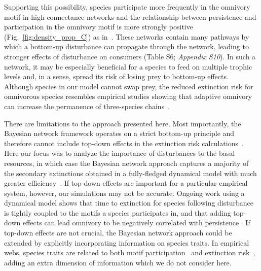 \documentclass[12pt]{article}
\begin{document}
\begin{spacing}{2.0}
    Supporting this possibility, species participate more frequently in the omnivory motif in high-connectance networks and the relationship between persistence and participation in the omnivory motif is more strongly positive (Fig.~\ref{fig:density_prop_C}) as in~\citet{McLeod2021}.
    These networks contain many pathways by which a bottom-up disturbance can propagate through the network, leading to stronger effects of disturbance on consumers (Table S6; \emph{Appendix S10}).
    In such a network, it may be especially beneficial for a species to feed on multiple trophic levels and, in a sense, spread its risk of losing prey to bottom-up effects.
    Although species in our model cannot swap prey, the reduced extinction risk for omnivorous species resembles empirical studies showing that adaptive omnivory can increase the permanence of three-species chains~\citep{Fagan1997, Kvrivan2005, AbramsFung2010}.
    
    
    There are limitations to the approach presented here.
    Most importantly, the Bayesian network framework operates on a strict bottom-up principle and therefore cannot include top-down effects in the extinction risk calculations~\citep{Eklof2013}. 
    Here our focus was to analyze the importance of disturbances to the basal resources, in which case the Bayesian network approach captures a majority of the secondary extinctions obtained in a fully-fledged dynamical model with much greater efficiency~\citep{Eklof2013}.
    If top-down effects are important for a particular empirical system, however, our simulations may not be accurate. 
    Ongoing work using a dynamical model shows that time to extinction for species following disturbance is tightly coupled to the motifs a species participates in, and that adding top-down effects can lead omnivory to be negatively correlated with persistence \citep{Cirtwill2021_inprep}. 
    If top-down effects are not crucial, the Bayesian network approach could be extended by explicitly incorporating information on species traits.
    In empirical webs, species traits are related to both motif participation~\citep{cirtwill2018feeding} and extinction risk~\citep{Brose2017, curtsdotter2011robustness, Cardillo2005, Purvis2000},
    adding an extra dimension of information which we do not consider here.
    

\end{spacing}
\end{document}
